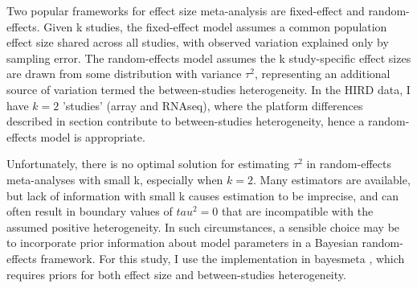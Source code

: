 %
%
%

Two popular frameworks for effect size meta-analysis are fixed-effect and random-effects\autocite{cohn2003HowMetaanalysisIncreases,borenstein2010BasicIntroductionFixedeffect}.
Given k studies, the fixed-effect model assumes a common population effect size shared across all studies, with observed variation explained only by sampling error.
The random-effects model assumes the k study-specific effect sizes are drawn from some distribution with variance $\tau^2$, representing an additional source of variation termed the between-studies heterogeneity.
In the \gls{HIRD} data, I have $k=2$ 'studies' (array and \gls{RNAseq}), where the platform differences described in section contribute to between-studies heterogeneity, hence a random-effects model is appropriate.

Unfortunately, there is no optimal solution for estimating $\tau^2$ in random-effects meta-analyses with small k\autocite{bender2018MethodsEvidenceSynthesis}, especially when $k=2$\autocite{gonnermann2015NoSolutionCombining}.
Many estimators are available\autocite{veroniki2016MethodsEstimateBetweenstudy}, but lack of information with small k causes estimation to be imprecise, and can often result in boundary values of $tau^2 = 0$ that are incompatible with the assumed positive heterogeneity\autocite{chung2013NondegeneratePenalizedLikelihood,friede2017MetaanalysisFewSmall}.
In such circumstances, a sensible choice may be to incorporate prior information about model parameters in a Bayesian random-effects framework\autocite{chung2013NondegeneratePenalizedLikelihood,veroniki2016MethodsEstimateBetweenstudy,friede2017MetaanalysisFewSmall,seide2019LikelihoodbasedRandomeffectsMetaanalysis}.
For this study, I use the implementation in bayesmeta \autocite{rover2017BayesianRandomeffectsMetaanalysis}, which requires priors for both effect size and between-studies heterogeneity.

